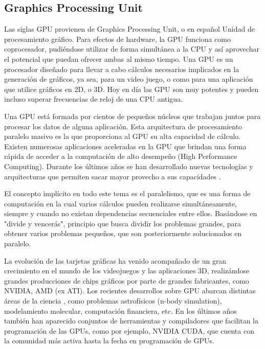 \subsection{Graphics Processing Unit}
Las siglas GPU provienen de Graphics Processing Unit, o en español Unidad de procesamiento gráfico. Para efectos de hardware, la GPU funciona como coprocesador,
pudiéndose utilizar de forma simultánea a la CPU y así aprovechar el potencial que puedan ofrecer ambas al mismo tiempo. Una GPU es un procesador
diseñado para llevar a cabo cálculos necesarios implicados en la generación de gráficos, ya sea, para un video juego, o como para una aplicación que utilice
gráficos en 2D, o 3D. Hoy en día las GPU son muy potentes y pueden incluso superar frecuencias de reloj de una CPU antigua.

Una GPU está formada por cientos de pequeños núcleos que trabajan juntos para procesar los datos de alguna aplicación. Esta arquitectura de procesamiento paralelo
masivo es la que proporciona al GPU su alta capacidad de cálculo. Existen numerosas aplicaciones aceleradas en la GPU que brindan una forma rápida de acceder
a la computación de alto desempeño (High Performance Computing). Durante los últimos años se han desarrollado nuevas tecnologías y arquitecturas
que permiten sacar mayor provecho a sus capacidades \cite{owens2007gpu}.

El concepto implícito en todo este tema es el paralelismo, que es una forma de computación en la cual varios cálculos pueden realizarse simultáneamente,
siempre y cuando no existan dependencias secuenciales entre ellos. Basándose en "divide y vencerás", principio que busca dividir los problemas grandes, para
obtener varios problemas pequeños, que son posteriormente solucionados en paralelo.

La evolución de las tarjetas gráficas ha venido acompañado de un gran crecimiento en el mundo de los videojuegos y las aplicaciones 3D, realizándose grandes
producciones de chips gráficos por parte de grandes fabricantes, como NVIDIA, AMD (ex ATI). Los recientes desarrollos sobre GPU abarcan distintas áreas de la ciencia \cite{kirk2010programming},
como problemas astrofísicos (n-body simulation), modelamiento molecular, computación financiera, etc. En los últimos años también han aparecido 
conjuntos de herramientas y compiladores que facilitan la programación de las GPUs, como por ejemplo, NVIDIA CUDA, que cuenta con la comunidad más activa hasta 
la fecha en programación de GPUs.

